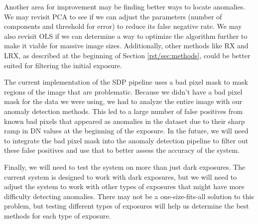 Another area for improvement may be finding better ways to locate anomalies.
We may revisit PCA to see if we can adjust the parameters (number of components and threshold for error) to reduce its false negative rate.
We may also revisit OLS if we can determine a way to optimize the algorithm further to make it viable for massive image sizes. 
Additionally, other methods like RX and LRX, as described at the beginning of Section \ref{rst/sec:methods}, could be better suited for filtering the initial exposure.

The current implementation of the SDP pipeline uses a bad pixel mask to mask regions of the image that are problematic. 
Because we didn't have a bad pixel mask for the data we were using, we had to analyze the entire image with our anomaly detection methods.
This led to a large number of false positives from known bad pixels that appeared as anomalies in the dataset due to their sharp ramp in DN values at the beginning of the exposure.
In the future, we will need to integrate the bad pixel mask into the anomaly detection pipeline to filter out these false positives and use that to better assess the accuracy of the system. 

Finally, we will need to test the system on more than just dark exposures.
The current system is designed to work with dark exposures, but we will need to adjust the system to work with other types of exposures that might have more difficulty detecting anomalies.
There may not be a one-size-fits-all solution to this problem, but testing different types of exposures will help us determine the best methods for each type of exposure.